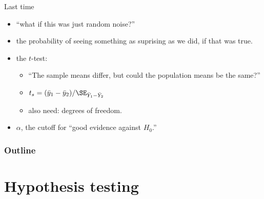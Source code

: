 
%
%
%



\subtitle{hypothesis testing, and one-sided tests}

\date{13 October 2015}





\begin{frame}
  \maketitle
\end{frame}

\begin{frame}{Last time}

  \begin{itemize}
    \item {} ``what if this was just random noise?''
    \item {} the probability of seeing something as suprising as we did, if that was true.
    \item the $t$-test: 
      \begin{itemize}
        \item ``The sample means differ, but could the population means be the same?''
        \item $t_s = (\bar y_1 - \bar y_2) / \SE_{\bar Y_1 - \bar Y_2}$
        \item also need: degrees of freedom.
      \end{itemize}
    \item {} $\alpha$, the cutoff for ``good evidence against $H_0$.''
  \end{itemize}

\end{frame}


\begin{frame}\frametitle<presentation>{Outline}
  \tableofcontents
\end{frame}



\section{Hypothesis testing}



